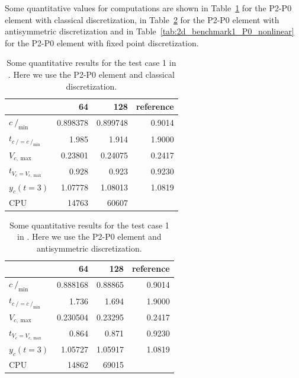 \documentclass[a4paper,12pt,onecolumn]{article}
\newcommand{\strikec}{\mbox{$c\!\!\!\!\:/$}}
\begin{document}
Some quantitative values for computations are shown in
Table~\ref{tab:2d_benchmark1_P0_classical} for the P2-P0 element with
classical discretization, in Table~\ref{tab:2d_benchmark1_P0_antisym} for the
P2-P0 element with antisymmetric discretization and in
Table~\ref{tab:2d_benchmark1_P0_nonlinear} for the P2-P0 element with fixed
point discretization.

\begin{table}
\center
\begin{tabular}{lrrr}
\hline
& 64 & 128 & reference \\
\hline
$\strikec_{\min}$ & 0.898378 & 0.899748 & 0.9014 \\
$t_{\strikec = \strikec_{\min}}$ & 1.985 & 1.914 & 1.9000 \\
$V_{c,\max}$ & 0.23801 & 0.24075 & 0.2417 \\
$t_{V_c = V_{c,\max}}$ & 0.928 & 0.923 & 0.9230 \\
$y_c(t=3)$ & 1.07778 & 1.08013 & 1.0819 \\
CPU & 14763 & 60607 & \\
\hline
\end{tabular}
\caption{Some quantitative results for the test case 1 in
\cite{HysingTKPBGT09}. Here we use the P2-P0 element and classical
discretization.}
\label{tab:2d_benchmark1_P0_classical}
\end{table}

\begin{table}
\center
\begin{tabular}{lrrr}
\hline
& 64 & 128 & reference \\
\hline
$\strikec_{\min}$ & 0.888168 & 0.88865 & 0.9014 \\
$t_{\strikec = \strikec_{\min}}$ & 1.736 & 1.694 & 1.9000 \\
$V_{c,\max}$ & 0.230504 & 0.23295 & 0.2417 \\
$t_{V_c = V_{c,\max}}$ & 0.864 & 0.871 & 0.9230 \\
$y_c(t=3)$ & 1.05727 & 1.05917 & 1.0819 \\
CPU & 14862 & 69015 & \\
\hline
\end{tabular}
\caption{Some quantitative results for the test case 1 in
\cite{HysingTKPBGT09}. Here we use the P2-P0 element and antisymmetric
discretization.}
\label{tab:2d_benchmark1_P0_antisym}
\end{table}
\end{document}
